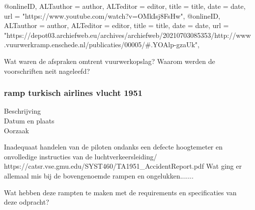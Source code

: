 @online{ID,	ALTauthor = {author},	ALTeditor = {editor},	title = {title},	date = {date},	url = {"https://www.youtube.com/watch?v=OMkIsj8FsHw"},}
@online{ID,	ALTauthor = {author},	ALTeditor = {editor},	title = {title},	date = {date},	url = {"https://depot03.archiefweb.eu/archives/archiefweb/20210703085353/http://www.vuurwerkramp.enschede.nl/publicaties/00005/#.YOAlp-gzaUk"},}

Wat waren de afspraken omtrent vuurwerkopslag?
Waarom werden de voorschriften neit nageleefd?
\subsubsection{ramp turkisch airlines vlucht 1951}

	\begin{description}
	\item[Beschrijving]
	\item[Datum en plaats] 
	\item[Oorzaak]
\end{description}
Inadequaat handelen van de piloten ondanks een defecte hoogtemeter en onvolledige instructies van de luchtverkeersleiding/
https://catsr.vse.gmu.edu/SYST460/TA1951_AccidentReport.pdf 
\cite{catsr25022009Boeing737AmsterdamCrash}
Wat ging er allemaal mis bij de bovengenoemde rampen en ongelukken....... 

Wat hebben deze rampten te maken met de requirements en specificaties van deze odpracht? 

